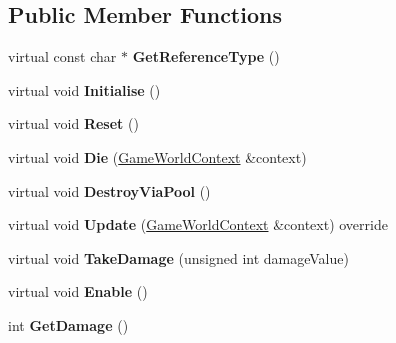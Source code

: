 \subsection*{Public Member Functions}
\begin{DoxyCompactItemize}
\item 
\hypertarget{class_arena_1_1_enemy_a9ebdb58b2731565c36e5c629086227fc}{virtual const char $\ast$ {\bfseries Get\+Reference\+Type} ()}\label{class_arena_1_1_enemy_a9ebdb58b2731565c36e5c629086227fc}

\item 
\hypertarget{class_arena_1_1_enemy_a210783fb287f22243ec8ac8f75e6a4a9}{virtual void {\bfseries Initialise} ()}\label{class_arena_1_1_enemy_a210783fb287f22243ec8ac8f75e6a4a9}

\item 
\hypertarget{class_arena_1_1_enemy_a726403d5782cbafb305e11c7d90a5e39}{virtual void {\bfseries Reset} ()}\label{class_arena_1_1_enemy_a726403d5782cbafb305e11c7d90a5e39}

\item 
\hypertarget{class_arena_1_1_enemy_a5d1019b8cdc7ef54b59e59d9590a28d6}{virtual void {\bfseries Die} (\hyperlink{struct_arena_1_1_game_world_context}{Game\+World\+Context} \&context)}\label{class_arena_1_1_enemy_a5d1019b8cdc7ef54b59e59d9590a28d6}

\item 
\hypertarget{class_arena_1_1_enemy_aea14958970021ec0008b4a25a1a7949f}{virtual void {\bfseries Destroy\+Via\+Pool} ()}\label{class_arena_1_1_enemy_aea14958970021ec0008b4a25a1a7949f}

\item 
\hypertarget{class_arena_1_1_enemy_a1ce5c09dd7e70bae8a523538a70f183c}{virtual void {\bfseries Update} (\hyperlink{struct_arena_1_1_game_world_context}{Game\+World\+Context} \&context) override}\label{class_arena_1_1_enemy_a1ce5c09dd7e70bae8a523538a70f183c}

\item 
\hypertarget{class_arena_1_1_enemy_aaa0e8e8b2a938edac8a9aec8e887952c}{virtual void {\bfseries Take\+Damage} (unsigned int damage\+Value)}\label{class_arena_1_1_enemy_aaa0e8e8b2a938edac8a9aec8e887952c}

\item 
\hypertarget{class_arena_1_1_enemy_a720a0a0e7d0c048015f0d0ecb8792245}{virtual void {\bfseries Enable} ()}\label{class_arena_1_1_enemy_a720a0a0e7d0c048015f0d0ecb8792245}

\item 
\hypertarget{class_arena_1_1_enemy_a14ee95b34c6028edf878898ed88518a4}{int {\bfseries Get\+Damage} ()}\label{class_arena_1_1_enemy_a14ee95b34c6028edf878898ed88518a4}


\end{DoxyCompactItemize}
